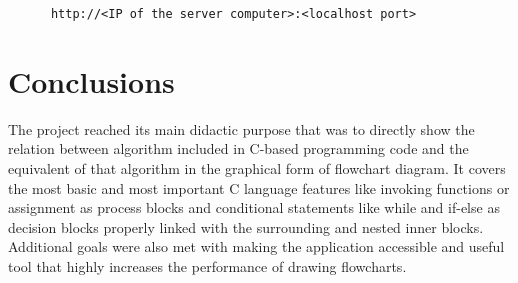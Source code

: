     \begin{verbatim}
      http://<IP of the server computer>:<localhost port>
    \end{verbatim}
     
\bigskip \bigskip

\section{Conclusions}
  The project reached its main didactic purpose that was to directly show the relation between algorithm included in C-based programming code and the equivalent of that algorithm in the graphical form of flowchart diagram. It covers the most basic and most important C language features like invoking functions or assignment as process blocks and conditional statements like while and if-else as decision blocks properly linked with the surrounding and nested inner blocks. Additional goals were also met with making the application accessible and useful tool that highly increases the performance of drawing flowcharts.